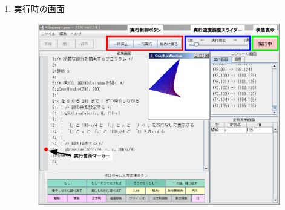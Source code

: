 \documentclass[11pt,a4j]{jarticle}
\begin{document}
\begin{enumerate}
\begin{enumerate}
\vspace{0.2cm}

\item 変数表示画面 \\
データ型、変数名と、変数に代入されている値が表示されます。 \\
プログラム実行時に変数の値の変化を観察することができます。 

\vspace{0.2cm}

\item プログラム入力支援ボタン \\
プログラムの入力を補助するためのボタンです。 \\
\begin{minipage}{12.0cm} \begin{itembox}[l]{「もし〜そうでなければ」のボタンで入力されるコード} \begin{verbatim}
もし ≪条件式≫ ならば
 　｜
を実行し，そうでなければ
 　｜
を実行する
\end{verbatim} \end{itembox} \end{minipage} \\
≪条件式≫など≪≫に囲まれた部分にカーソルを移動すると≪≫の部分全体が選択され、 \\
そこに書くべき式などに簡単に書き換えることができます。

\vspace{0.2cm}

\item GraphicWindow \\
図形描画の出力はこのウィンドウに表示されます。 \\
描画関連の命令は `xDNCL-Draw.pdf' をご覧ください。
\end{enumerate}

\newpage

\item 実行時の画面 
\begin{figure}[htbp]
  \vspace{-0.3cm}
  \begin{center}
    \includegraphics[width=12.0cm]{./eps/pen002.eps}
    \vspace{-1.0cm}
  \end{center}
\end{figure}


\end{enumerate}
\end{document}
